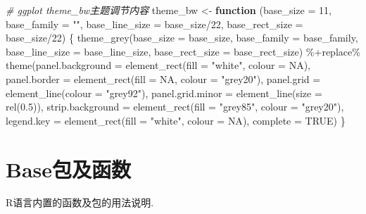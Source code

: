 \documentclass[
]{book}
\newenvironment{Shaded}{\begin{snugshade}}{\end{snugshade}}
\newcommand{\AttributeTok}[1]{\textcolor[rgb]{0.77,0.63,0.00}{#1}}
\newcommand{\CommentTok}[1]{\textcolor[rgb]{0.56,0.35,0.01}{\textit{#1}}}
\newcommand{\ConstantTok}[1]{\textcolor[rgb]{0.00,0.00,0.00}{#1}}
\newcommand{\ControlFlowTok}[1]{\textcolor[rgb]{0.13,0.29,0.53}{\textbf{#1}}}
\newcommand{\DecValTok}[1]{\textcolor[rgb]{0.00,0.00,0.81}{#1}}
\newcommand{\FloatTok}[1]{\textcolor[rgb]{0.00,0.00,0.81}{#1}}
\newcommand{\FunctionTok}[1]{\textcolor[rgb]{0.00,0.00,0.00}{#1}}
\newcommand{\NormalTok}[1]{#1}
\newcommand{\OtherTok}[1]{\textcolor[rgb]{0.56,0.35,0.01}{#1}}
\newcommand{\SpecialCharTok}[1]{\textcolor[rgb]{0.00,0.00,0.00}{#1}}
\newcommand{\StringTok}[1]{\textcolor[rgb]{0.31,0.60,0.02}{#1}}
\begin{document}
\begin{Shaded}
\begin{Highlighting}[]
\CommentTok{\# ggplot theme\_bw主题调节内容}
\NormalTok{theme\_bw }\OtherTok{\textless{}{-}} \ControlFlowTok{function}\NormalTok{ (}\AttributeTok{base\_size =} \DecValTok{11}\NormalTok{, }\AttributeTok{base\_family =} \StringTok{""}\NormalTok{, }\AttributeTok{base\_line\_size =}\NormalTok{ base\_size}\SpecialCharTok{/}\DecValTok{22}\NormalTok{, }\AttributeTok{base\_rect\_size =}\NormalTok{ base\_size}\SpecialCharTok{/}\DecValTok{22}\NormalTok{) \{}
    \FunctionTok{theme\_grey}\NormalTok{(}\AttributeTok{base\_size =}\NormalTok{ base\_size, }
               \AttributeTok{base\_family =}\NormalTok{ base\_family, }
               \AttributeTok{base\_line\_size =}\NormalTok{ base\_line\_size, }\AttributeTok{base\_rect\_size =}\NormalTok{ base\_rect\_size) }\SpecialCharTok{\%+replace\%} 
    \FunctionTok{theme}\NormalTok{(}\AttributeTok{panel.background =} \FunctionTok{element\_rect}\NormalTok{(}\AttributeTok{fill =} \StringTok{"white"}\NormalTok{, }\AttributeTok{colour =} \ConstantTok{NA}\NormalTok{), }
          \AttributeTok{panel.border =} \FunctionTok{element\_rect}\NormalTok{(}\AttributeTok{fill =} \ConstantTok{NA}\NormalTok{, }\AttributeTok{colour =} \StringTok{"grey20"}\NormalTok{), }
          \AttributeTok{panel.grid =} \FunctionTok{element\_line}\NormalTok{(}\AttributeTok{colour =} \StringTok{"grey92"}\NormalTok{), }
          \AttributeTok{panel.grid.minor =} \FunctionTok{element\_line}\NormalTok{(}\AttributeTok{size =} \FunctionTok{rel}\NormalTok{(}\FloatTok{0.5}\NormalTok{)), }
          \AttributeTok{strip.background =} \FunctionTok{element\_rect}\NormalTok{(}\AttributeTok{fill =} \StringTok{"grey85"}\NormalTok{, }\AttributeTok{colour =} \StringTok{"grey20"}\NormalTok{), }
          \AttributeTok{legend.key =} \FunctionTok{element\_rect}\NormalTok{(}\AttributeTok{fill =} \StringTok{"white"}\NormalTok{, }\AttributeTok{colour =} \ConstantTok{NA}\NormalTok{), }\AttributeTok{complete =} \ConstantTok{TRUE}\NormalTok{)}
\NormalTok{\}}
\end{Highlighting}
\end{Shaded}

\hypertarget{baseux5305ux53caux51fdux6570-1}{%
\chapter{Base包及函数}\label{baseux5305ux53caux51fdux6570-1}}

R语言内置的函数及包的用法说明.
\end{document}
